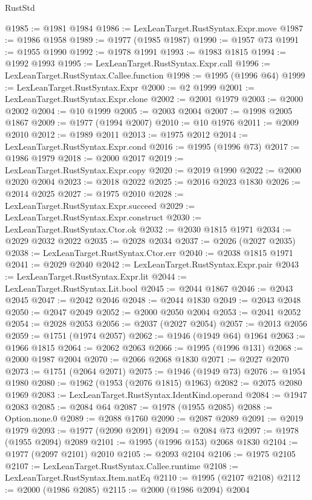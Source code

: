 \begin{lexlean}{RustStd}
\begin{coremodule}
@1985 := @1981 @1984
@1986 := LexLeanTarget.RustSyntax.Expr.move
@1987 := @1986 @1958
@1989 := @1977 (@1985 @1987)
@1990 := @1957 @73
@1991 := @1955 @1990
@1992 := @1978 @1991
@1993 := @1983 @1815
@1994 := @1992 @1993
@1995 := LexLeanTarget.RustSyntax.Expr.call
@1996 := LexLeanTarget.RustSyntax.Callee.function
@1998 := @1995 (@1996 @64)
@1999 := LexLeanTarget.RustSyntax.Expr
@2000 := @2 @1999
@2001 := LexLeanTarget.RustSyntax.Expr.clone
@2002 := @2001 @1979
@2003 := @2000 @2002
@2004 := @10 @1999
@2005 := @2003 @2004
@2007 := @1998 @2005 @1867
@2009 := @1977 (@1994 @2007)
@2010 := @10 @1976
@2011 := @2009 @2010
@2012 := @1989 @2011
@2013 := @1975 @2012
@2014 := LexLeanTarget.RustSyntax.Expr.cond
@2016 := @1995 (@1996 @73)
@2017 := @1986 @1979
@2018 := @2000 @2017
@2019 := LexLeanTarget.RustSyntax.Expr.copy
@2020 := @2019 @1990
@2022 := @2000 @2020 @2004
@2023 := @2018 @2022
@2025 := @2016 @2023 @1830
@2026 := @2014 @2025
@2027 := @1975 @2010
@2028 := LexLeanTarget.RustSyntax.Expr.succeed
@2029 := LexLeanTarget.RustSyntax.Expr.construct
@2030 := LexLeanTarget.RustSyntax.Ctor.ok
@2032 := @2030 @1815 @1971
@2034 := @2029 @2032 @2022
@2035 := @2028 @2034
@2037 := @2026 (@2027 @2035)
@2038 := LexLeanTarget.RustSyntax.Ctor.err
@2040 := @2038 @1815 @1971
@2041 := @2029 @2040
@2042 := LexLeanTarget.RustSyntax.Expr.pair
@2043 := LexLeanTarget.RustSyntax.Expr.lit
@2044 := LexLeanTarget.RustSyntax.Lit.bool
@2045 := @2044 @1867
@2046 := @2043 @2045
@2047 := @2042 @2046
@2048 := @2044 @1830
@2049 := @2043 @2048
@2050 := @2047 @2049
@2052 := @2000 @2050 @2004
@2053 := @2041 @2052
@2054 := @2028 @2053
@2056 := @2037 (@2027 @2054)
@2057 := @2013 @2056
@2059 := @1751 (@1974 @2057)
@2062 := @1946 (@1949 @64) @1964
@2063 := @1966 @1815
@2064 := @2062 @2063
@2066 := @1995 (@1996 @131)
@2068 := @2000 @1987 @2004
@2070 := @2066 @2068 @1830
@2071 := @2027 @2070
@2073 := @1751 (@2064 @2071)
@2075 := @1946 (@1949 @73)
@2076 := @1954 @1980
@2080 := @1962 (@1953 (@2076 @1815) @1963)
@2082 := @2075 @2080 @1969
@2083 := LexLeanTarget.RustSyntax.IdentKind.operand
@2084 := @1947 @2083
@2085 := @2084 @64
@2087 := @1978 (@1955 @2085)
@2088 := Option.none.{0}
@2089 := @2088 @1760
@2090 := @2087 @2089
@2091 := @2019 @1979
@2093 := @1977 (@2090 @2091)
@2094 := @2084 @73
@2097 := @1978 (@1955 @2094) @2089
@2101 := @1995 (@1996 @153) @2068 @1830
@2104 := @1977 (@2097 @2101) @2010
@2105 := @2093 @2104
@2106 := @1975 @2105
@2107 := LexLeanTarget.RustSyntax.Callee.runtime
@2108 := LexLeanTarget.RustSyntax.Item.natEq
@2110 := @1995 (@2107 @2108)
@2112 := @2000 (@1986 @2085)
@2115 := @2000 (@1986 @2094) @2004

\end{coremodule}
\end{lexlean}
